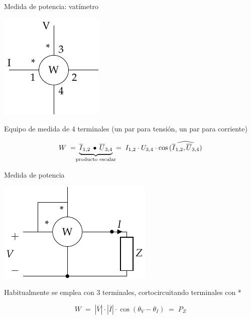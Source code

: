 \documentclass[aspectratio=169, usenames,svgnames,dvipsnames]{beamer}
\begin{document}

\begin{frame}{Medida de potencia: \hspace{3mm}vatímetro}
    \vspace{3mm}
    \begin{center}
        \includegraphics[height=0.5\textheight]{../figs/vatimetro_2.pdf}
    \end{center}

    \vspace{2mm}
    
    \centering Equipo de medida de \alert{4 terminales} (un par para tensión, un par para corriente)

    \vspace{-4mm}
    \begin{equation*}
        W \; = \; \hspace{-2mm} \underbrace{ \overline{I}_{1,2}\,\bullet\,\overline{U}_{3,4} }_{\substack{\text{producto escalar}}} \hspace{-2mm} \; = \;  
        I_{1,2}\cdot U_{3,4}\cdot \cos\widehat{(\overline{I}_{1,2}, \overline{U}_{3,4})}
	\end{equation*}
\end{frame}


\begin{frame}{Medida de potencia}
    \begin{center}
        \includegraphics[height=0.5\textheight]{../figs/vatimetro_Z.pdf}
    \end{center}

    \vspace{2mm}
    
    \centering Habitualmente se emplea con 3 terminales, \alert{cortocircuitando} terminales con *

    \vspace{-3mm}
    \[
      \boxed{\; W \; = \; |\overline{V}| \cdot |\overline{I}| \cdot \cos(\theta_V - \theta_I) \; = \; P_Z \;}
    \]
\end{frame}
\end{document}
